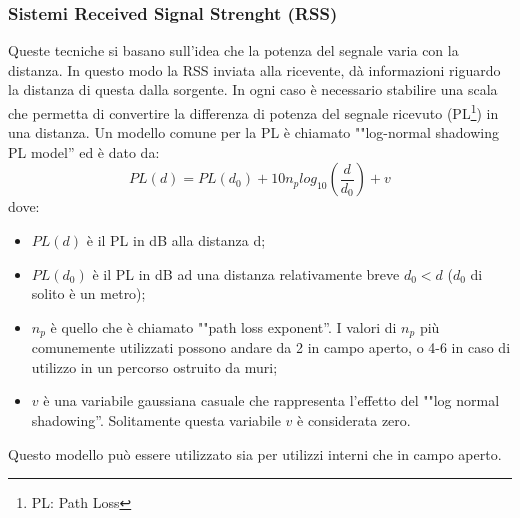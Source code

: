 \subsubsection{Sistemi Received Signal Strenght (RSS)}
Queste tecniche si basano sull'idea che la potenza del segnale varia con la distanza. In questo modo la RSS inviata alla ricevente, dà informazioni riguardo la distanza di questa dalla sorgente. In ogni caso è necessario stabilire una scala che permetta di convertire la differenza di potenza del segnale ricevuto (PL\footnote{PL: Path Loss}) in una distanza. Un modello comune per la PL è chiamato ""log-normal shadowing PL model'' ed è dato da:
 $$ PL\left(d\right) = PL\left(d_0\right) + 10n_plog_{10} \left( \frac{d}{d_0} \right) + v $$
dove:
\begin{itemize}
\item $ PL(d) $ è il PL in dB alla distanza d; 
\item $ PL(d_0) $ è il PL in dB ad una distanza relativamente breve $ d_0 < d $ ($ d_{0} $ di solito è un metro); 
\item $n_p$ è quello che è chiamato ""path loss exponent''. I valori di $n_p$ più comunemente utilizzati possono andare da 2 in campo aperto, o 4-6 in caso di utilizzo in un percorso ostruito da muri;
\item $v$ è una variabile gaussiana casuale che rappresenta l'effetto del ""log normal shadowing''. Solitamente questa variabile $v$ è considerata zero. 
\end{itemize}
Questo modello può essere utilizzato sia per utilizzi interni che in campo aperto. 

